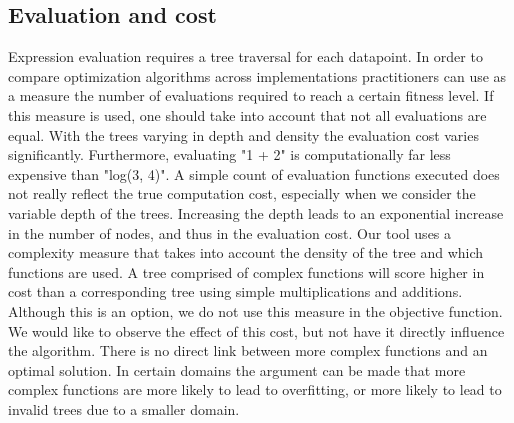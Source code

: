\subsection{Evaluation and cost}
Expression evaluation requires a tree traversal for each datapoint. In order to compare optimization algorithms across implementations practitioners can use as a measure the number of evaluations required to reach a certain fitness level. If this measure is used, one should take into account that not all evaluations are equal. With the trees varying in depth and density the evaluation cost varies significantly. Furthermore, evaluating "1 + 2" is computationally far less expensive than "log(3, 4)". A simple count of evaluation functions executed does not really reflect the true computation cost, especially when we consider the variable depth of the trees. Increasing the depth leads to an exponential increase in the number of nodes, and thus in the evaluation cost.
Our tool uses a complexity measure that takes into account the density of the tree and which functions are used. A tree comprised of complex functions will score higher in cost than a corresponding tree using simple multiplications and additions. Although this is an option, we do not use this measure in the objective function. We would like to observe the effect of this cost, but not have it directly influence the algorithm. There is no direct link between more complex functions and an optimal solution. In certain domains the argument can be made that more complex functions are more likely to lead to overfitting, or more likely to lead to invalid trees due to a smaller domain.

